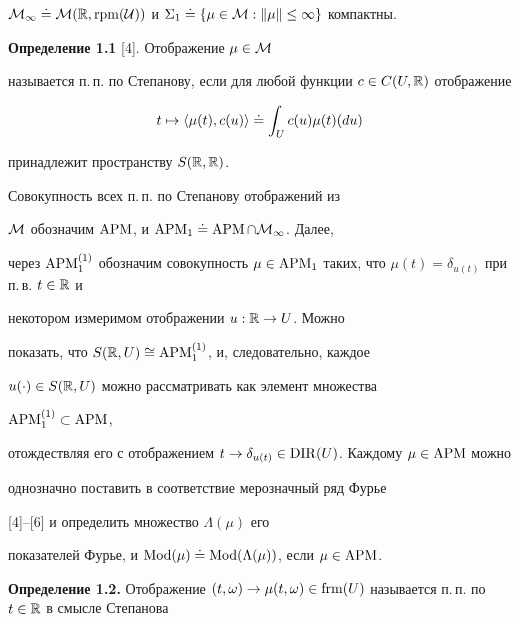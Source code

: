 $\cal M_1\doteq\cal M(\Bbb R,\rpm(U))$ и $\Sigma_1\doteq


\{\mu\in\cal M : \|\mu\|\le 1\}$ компактны.


\medskip





{\bf Определение 1.1} [4]. Отображение $\mu\in\cal M$


называется п.\,п. по Степанову, если для любой функции $c\in


C(U,\Bbb R)$ отображение


$$


t\mapsto\la \mu(t),c(u)\ra\doteq \int_U c(u)\mu(t)(du)


$$


принадлежит пространству $S(\Bbb R,\Bbb R)$.


\medskip





Совокупность всех п.\,п. по Степанову отображений из


$\cal M$ обозначим $\operatorname{APM}$, и $\operatorname{APM}_1\doteq\operatorname{APM}\cap\cal M_1$. Далее,


через $\APM_1^{(1)}$ обозначим совокупность $\mu\in


\APM_1$ таких, что $\mu(t)=\delta_{u(t)}$ при п.\,в. $t\in \Bbb R$ и


некотором измеримом отображении $u:\Bbb R\to U$. Можно


показать, что $S(\Bbb R,U)\cong \operatorname{APM}_1^{(1)}$, и, следовательно, каждое


$u(\cdot)\in S(\Bbb R,U)$ можно рассматривать как элемент множества


$\operatorname{APM}_1^{(1)}\subset \operatorname{APM}$,


отождествляя его с отображением $t\to


\delta_{u(t)}\in \DIR(U)$. Каждому $\mu\in \APM$ можно


однозначно поставить в соответствие мерозначный ряд Фурье


[4]--[6] и определить множество $\Lambda(\mu)$ его


показателей Фурье, и $\Mod


(\mu)\doteq \Mod(\Lambda(\mu))$, если $\mu\in \APM$.


\medskip





{\bf Определение 1.2.} Отображение $\tm\to


\mu\tm\in \frm(U)$ называется п.\,п. по $t\in \Bbb R$ в смысле Степанова


